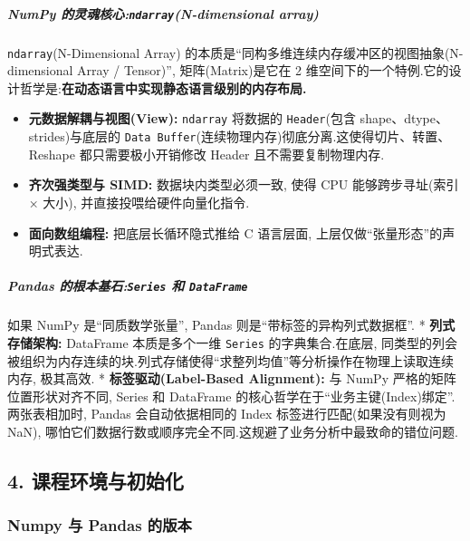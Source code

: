 \documentclass[11pt]{article}
\providecommand{\tightlist}{%
      \setlength{\itemsep}{0pt}\setlength{\parskip}{0pt}}
\begin{document}
\subparagraph{\texorpdfstring{NumPy
的灵魂核心:\texttt{ndarray}(N-dimensional
array)}{NumPy 的灵魂核心:ndarray(N-dimensional array)}}\label{numpy-ux7684ux7075ux9b42ux6838ux5fc3ndarrayn-dimensional-array}

\texttt{ndarray}(N-Dimensional Array)
的本质是``同构多维连续内存缓冲区的视图抽象(N-dimensional Array /
Tensor)'', 矩阵(Matrix)是它在 2
维空间下的一个特例.它的设计哲学是:\textbf{在动态语言中实现静态语言级别的内存布局.}

\begin{itemize}
\tightlist
\item
  \textbf{元数据解耦与视图(View):} \texttt{ndarray} 将数据的
  \texttt{Header}(包含 shape、dtype、strides)与底层的
  \texttt{Data\ Buffer}(连续物理内存)彻底分离.这使得切片、转置、Reshape
  都只需要极小开销修改 Header 且不需要复制物理内存.
\item
  \textbf{齐次强类型与 SIMD:} 数据块内类型必须一致, 使得 CPU
  能够跨步寻址(索引 × 大小), 并直接投喂给硬件向量化指令.
\item
  \textbf{面向数组编程:} 把底层长循环隐式推给 C 语言层面,
  上层仅做``张量形态''的声明式表达.
\end{itemize}

\subparagraph{\texorpdfstring{Pandas 的根本基石:\texttt{Series} 和
\texttt{DataFrame}}{Pandas 的根本基石:Series 和 DataFrame}}\label{pandas-ux7684ux6839ux672cux57faux77f3series-ux548c-dataframe}

如果 NumPy 是``同质数学张量'', Pandas 则是``带标签的异构列式数据框''. *
\textbf{列式存储架构:} DataFrame 本质是多个一维 \texttt{Series}
的字典集合.在底层,
同类型的列会被组织为内存连续的块.列式存储使得``求整列均值''等分析操作在物理上读取连续内存,
极其高效. * \textbf{标签驱动(Label-Based Alignment):} 与 NumPy
严格的矩阵位置形状对齐不同, Series 和 DataFrame
的核心哲学在于``业务主键(Index)绑定''.两张表相加时, Pandas
会自动依据相同的 Index 标签进行匹配(如果没有则视为 NaN),
哪怕它们数据行数或顺序完全不同.这规避了业务分析中最致命的错位问题.

    \subsection{4.
课程环境与初始化}\label{ux8bfeux7a0bux73afux5883ux4e0eux521dux59cbux5316}

\subsubsection{Numpy 与 Pandas
的版本}\label{numpy-ux4e0e-pandas-ux7684ux7248ux672c}
\end{document}
